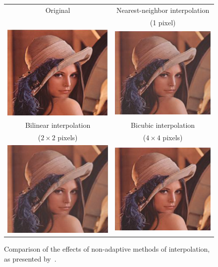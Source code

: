\begin{figure}[t]
\centering
{\sffamily
\begin{tabular}{cc}
Original & Nearest-neighbor interpolation\\
 & (1 pixel) \\
\includegraphics[width=.4\linewidth]{img/preprocessing/interp_orig.png}
&
\includegraphics[width=.4\linewidth]{img/preprocessing/interp_nn.png}
\vspace{1em} \\
Bilinear interpolation & Bicubic interpolation \\
($2\times2$ pixels) & ($4\times4$ pixels) \\
\includegraphics[width=.4\linewidth]{img/preprocessing/interp_bili.png}
&
\includegraphics[width=.4\linewidth]{img/preprocessing/interp_bicubic.png}
\end{tabular}
}
\caption{Comparison of the effects of non-adaptive methods of interpolation, as presented by~\citet{prajapati2012evaluation}.}
\label{fig:preprocessInterpolation}
\end{figure}

